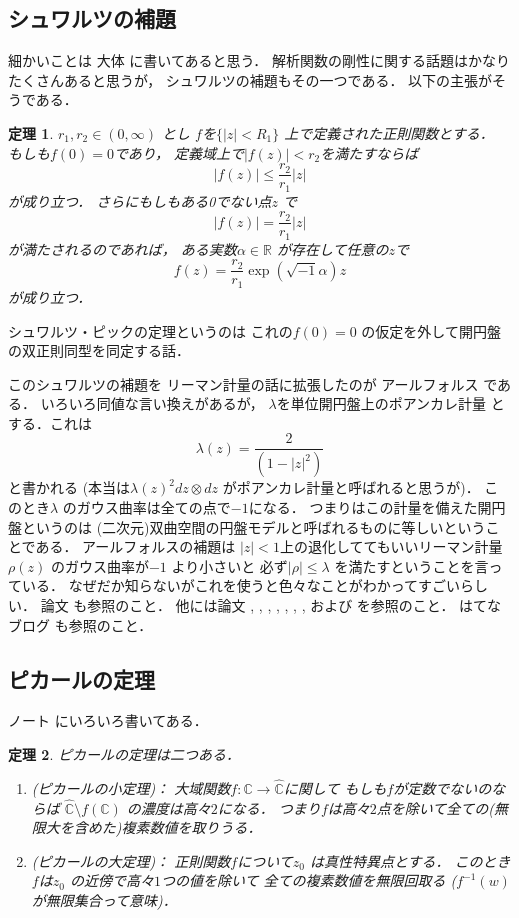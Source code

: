 \documentclass[leqno, a4paper, 12pt]{jsarticle}
\newtheorem{thm}{定理}
\newcommand{\rr}{\mathbb{R}}
\newcommand{\cc}{\mathbb{C}}
\begin{document}
\subsection{シュワルツの補題}
細かいことは
大体
\cite{MR1704258}
に書いてあると思う．
解析関数の剛性に関する話題はかなりたくさんあると思うが，
シュワルツの補題もその一つである．
以下の主張がそうである．
\begin{thm}
$r_{1}, r_{2}\in (0, \infty)$
とし
$f$を$\{|z|<R_{1}\}$
上で定義された正則関数とする．
もしも$f(0)=0$であり，
定義域上で$|f(z)|<r_{2}$を満たすならば
\[
|f(z)|\le \frac{r_{2}}{r_{1}}|z|
\]
が成り立つ．
さらにもしもある0でない点$z$
で
\[
|f(z)|=\frac{r_{2}}{r_{1}}|z|
\]
が満たされるのであれば，
ある実数$\alpha\in \rr$
が存在して任意の$z$で
\[
f(z)=\frac{r_{2}}{r_{1}}\exp(\sqrt{-1}\alpha)z
\]
が成り立つ．
\end{thm}
シュワルツ・ピックの定理というのは
これの$f(0)=0$
の仮定を外して開円盤の双正則同型を同定する話．


このシュワルツの補題を
リーマン計量の話に拡張したのが
アールフォルス
\cite{MR1501949}
である．
いろいろ同値な言い換えがあるが，
$\lambda$を単位開円盤上のポアンカレ計量
とする．これは
\[
\lambda(z)=\frac{2}{(1-|z|^{2})}
\]
と書かれる
(本当は$\lambda(z)^{2}dz\otimes dz$
がポアンカレ計量と呼ばれると思うが)．
このとき$\lambda$
のガウス曲率は全ての点で$-1$になる．
つまりはこの計量を備えた開円盤というのは
(二次元)双曲空間の円盤モデルと呼ばれるものに等しいということである．
アールフォルスの補題は
$|z|<1$上の退化しててもいいリーマン計量$\rho(z)$
のガウス曲率が$-1$
より小さいと
必ず$|\rho|\le \lambda$
を満たすということを言っている．
なぜだか知らないがこれを使うと色々なことがわかってすごいらしい．
論文\cite{MR0725266}
も参照のこと．
他には論文
\cite{MR0690493}, 
\cite{MR0486659}, 
\cite{MR2492498}, 
\cite{MR2120588}, 
\cite{MR1694951}, 
\cite{MR0908253}, 
\cite{MR3451773}, 
および
\cite{MR2745751}
を参照のこと．
はてなブログ
\cite{hahaha1}
も参照のこと．



\subsection{ピカールの定理}
ノート
\cite{pipi2015}
にいろいろ書いてある．


\begin{thm}
ピカールの定理は二つある．
\begin{enumerate}
\item (ピカールの小定理)：
大域関数$f\colon \cc\to \hat{\cc}$に関して
もしも$f$が定数でないのならば
$\hat{\cc}\setminus f(\cc)$
の濃度は高々$2$になる．
つまり$f$は高々$2$点を除いて全ての(無限大を含めた)複素数値を取りうる．

\item (ピカールの大定理)：
正則関数$f$について$z_{0}$
は真性特異点とする．
このとき$f$は$z_{0}$
の近傍で高々$1$つの値を除いて
全ての複素数値を無限回取る
($f^{-1}(w)$が無限集合って意味)．

\end{enumerate}
\end{thm}
\end{document}
